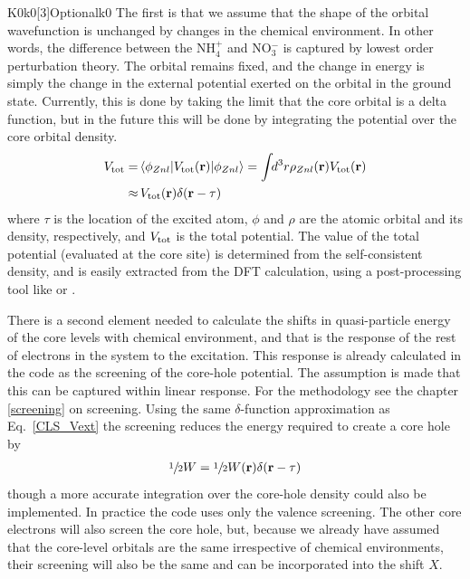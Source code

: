 \documentclass[11pt]{report}
\begin{document}
\begin{Card}{K0}{k0[3]}{Optional}{k0}
The first is that we assume that the shape of the orbital wavefunction is unchanged by changes in the chemical environment. In other words, the difference between the NH$_4^+$ and NO$_3^-$ is captured by lowest order perturbation theory. 
The orbital remains fixed, and the change in energy is simply the change in the external potential exerted on the orbital in the ground state. 
Currently, this is done by taking the limit that the core orbital is a delta function, but in the future this will be done by integrating the potential over the core orbital density. 
\begin{align}
V_{\rm{tot}} =& \, \langle \phi_{Znl} \vert V_{\rm{tot}}(\mathbf{r}) \vert \phi_{Znl} \rangle = \int \!\! d^3r \rho_{Znl}(\mathbf{r})  V_{\rm{tot}}(\mathbf{r}) \nonumber \\
\approx&  \, V_{\rm{tot}}(\mathbf{r})  \delta(\mathbf{r} - \mathbf{\tau}) 
\label{CLS_Vext}
\end{align}
where $\tau$ is the location of the excited atom, $\phi$ and $\rho$ are the atomic orbital and its density, respectively, and $V_{\rm{tot}}$ is the total potential. 
The value of the total potential (evaluated at the core site) is determined from the self-consistent density, and is easily extracted from the DFT calculation, using a post-processing tool like  or .

There is a second element needed to calculate the shifts in quasi-particle energy of the core levels with chemical environment, and that is the response of the rest of electrons in the system to the excitation. 
This response is already calculated in the code as the screening of the core-hole potential.
The assumption is made that this can be captured within linear response. For the methodology see the chapter \ref{screening} on screening.
Using the same $\delta$-function approximation as Eq.~\ref{CLS_Vext} the screening reduces the energy required to create a core hole by
\begin{align}
\sfrac{1}{2} W = \sfrac{1}{2} W(\mathbf{r}) \delta(\mathbf{r} - \mathbf{\tau}) 
\end{align}
though a more accurate integration over the core-hole density could also be implemented. 
In practice the code uses only the valence screening. The other core electrons will also screen the core hole, but, because we already have assumed that the core-level orbitals are the same irrespective of chemical environments, their screening will also be the same and can be incorporated into the shift $X$.


\end{Card}
\end{document}
